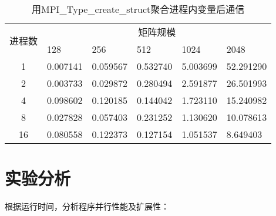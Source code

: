 \documentclass{SYSUReport}
\begin{document}
\begin{table}[H]
\centering
\caption{用MPI\_Type\_create\_struct聚合进程内变量后通信}
\label{表2}
\begin{tabular}{|c|lllll|}
\hline
\multirow{2}{*}{进程数} & \multicolumn{5}{c|}{矩阵规模}                                                                        \\ \cline{2-6} 
 & \multicolumn{1}{l|}{128} & \multicolumn{1}{l|}{256} & \multicolumn{1}{l|}{512} & \multicolumn{1}{l|}{1024} & 2048 \\ \hline
1                    & \multicolumn{1}{l|}{0.007141} & \multicolumn{1}{l|}{0.059567} & \multicolumn{1}{l|}{0.532740} & \multicolumn{1}{l|}{5.003699} & 52.291290 \\ \hline
2                    & \multicolumn{1}{l|}{0.003733} & \multicolumn{1}{l|}{0.029872} & \multicolumn{1}{l|}{0.280494} & \multicolumn{1}{l|}{2.591877} & 26.501993 \\ \hline
4                    & \multicolumn{1}{l|}{0.098602} & \multicolumn{1}{l|}{0.120185} & \multicolumn{1}{l|}{0.144042} & \multicolumn{1}{l|}{1.723110} & 15.240982 \\ \hline
8                    & \multicolumn{1}{l|}{0.027828} & \multicolumn{1}{l|}{0.057403} & \multicolumn{1}{l|}{0.231252} & \multicolumn{1}{l|}{1.130620} & 10.078613 \\ \hline
16                   & \multicolumn{1}{l|}{0.080558} & \multicolumn{1}{l|}{0.122373} & \multicolumn{1}{l|}{0.127154} & \multicolumn{1}{l|}{1.051537} & 8.649403 \\ \hline
\end{tabular}
\end{table}


\section{实验分析}
根据运行时间，分析程序并行性能及扩展性：
\end{document}
